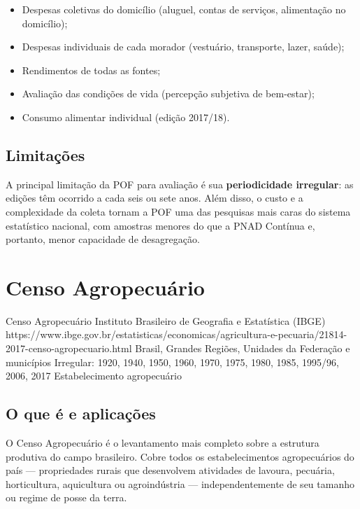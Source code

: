 \begin{itemize}
  \item Despesas coletivas do domicílio (aluguel, contas de serviços, alimentação no domicílio);
  \item Despesas individuais de cada morador (vestuário, transporte, lazer, saúde);
  \item Rendimentos de todas as fontes;
  \item Avaliação das condições de vida (percepção subjetiva de bem-estar);
  \item Consumo alimentar individual (edição 2017/18).
\end{itemize}

\subsection{Limitações}

A principal limitação da POF para avaliação é sua \textbf{periodicidade irregular}: as edições têm ocorrido a cada seis ou sete anos. Além disso, o custo e a complexidade da coleta tornam a POF uma das pesquisas mais caras do sistema estatístico nacional, com amostras menores do que a PNAD Contínua e, portanto, menor capacidade de desagregação.

\section{Censo Agropecuário}

\ficharapida
  {Censo Agropecuário}
  {Instituto Brasileiro de Geografia e Estatística (IBGE)}
  {https://www.ibge.gov.br/estatisticas/economicas/agricultura-e-pecuaria/21814-2017-censo-agropecuario.html}
  {Brasil, Grandes Regiões, Unidades da Federação e municípios}
  {Irregular: 1920, 1940, 1950, 1960, 1970, 1975, 1980, 1985, 1995/96, 2006, 2017}
  {Estabelecimento agropecuário}

\subsection{O que é e aplicações}

O Censo Agropecuário é o levantamento mais completo sobre a estrutura produtiva do campo brasileiro. Cobre todos os estabelecimentos agropecuários do país --- propriedades rurais que desenvolvem atividades de lavoura, pecuária, horticultura, aquicultura ou agroindústria --- independentemente de seu tamanho ou regime de posse da terra.

